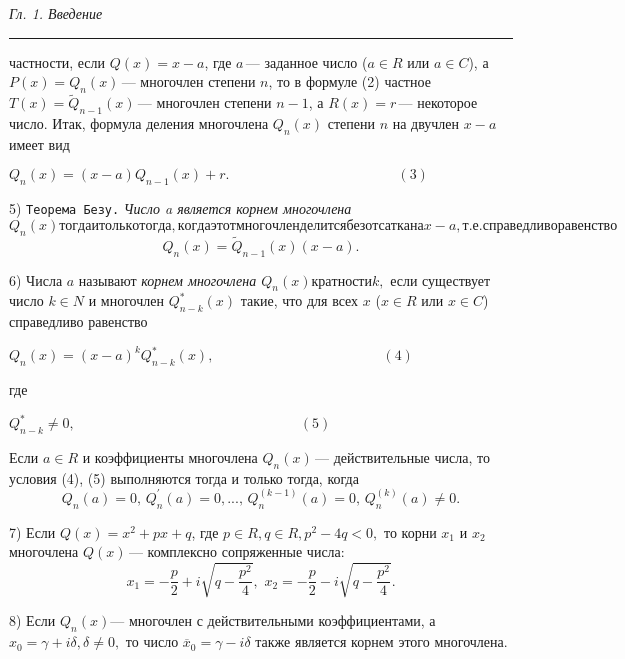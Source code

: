 \documentclass[a5paper, 16pt]{book}
\begin{document}
    \newpage

    \setcounter{page}{48}
    \begin{center}
        \begin{spacing}
            \small{\textit{Гл. 1. Введение}}
            \noindent\rule{\textwidth}{1pt}
		\end{spacing}
    \end{center}
     частности, если $Q(x) = x - a$, где $a \, \textbf{---}$ заданное число ($a \in R$ или $a \in C$), а $P(x) = Q_n (x) \, \textbf{---}$ многочлен степени $n$, то в формуле (2) частное $T(x) = \widetilde Q _ {n - 1} (x) \, \textbf{---}$ многочлен степени $n - 1$, а $R(x) = r \, \textbf{---}$ некоторое число. Итак, формула деления многочлена $Q_n (x)$ степени $n$ на двучлен $x - a$ имеет вид
    \begin{flushright}
    $Q_n (x) = (x - a)Q_{n - 1} (x) + r. \qquad \qquad \qquad \qquad \qquad \qquad (3)$
    \end{flushright}
    \par5) \texttt{Теорема Безу.} \textit{Число a является корнем многочлена $Q_n (x) тогда и только тогда, когда этот многочлен делится без отсатка на x - a, т.е. справедливо равенство$}
    $$Q_n (x) = \widetilde Q _{n - 1} (x)(x - a).$$
    \par6) Числа $a$ называют \textit{корнем многочлена $Q_n (x) кратности k,$} если существует число $k \in N$ и многочлен $Q _{n - k} ^ * (x)$ такие, что для всех $x$ ($x \in R$ или $x \in C$) справедливо равенство  
    \begin{flushright}
    $Q_n (x) = (x- a)^k Q_{n - k} ^ * (x), \qquad \qquad \qquad \qquad \qquad \qquad (4)$
    \end{flushright}
    где
    \begin{flushright}
    $Q_{n - k} ^ *  \neq 0, \qquad \qquad \qquad \qquad \qquad \qquad \qquad \qquad (5)$
    \end{flushright}
    Если $a \in R$ и коэффициенты многочлена $Q_n (x) \, \textbf{---}$ действительные числа, то условия (4), (5) выполняются тогда и только тогда, когда
    $$Q_n (a) = 0, \, Q_n ^ {'} (a) = 0, ..., \, Q_n ^ (k - 1) (a) = 0, \, Q_n ^ {(k)} (a) \neq 0.$$
    \par7) Если $Q(x) = x^2 +px +q$, где $p \in R, q \in R, p^2 - 4q < 0,$ то корни $x_1$ и $x_2$ многочлена $Q(x) \, \textbf{---}$ комплексно сопряженные числа:
    $$x_1 = -\frac{p}{2} + i\sqrt{q - \frac{p^2}{4}} , \, \, x_2 = -\frac{p}{2} - i\sqrt{q - \frac{p^2}{4}} .$$
    \par8) Если $Q_n (x) \textbf{---}$ многочлен с действительными коэффициентами, а $x_0 = \gamma + i\delta, \delta \neq 0,$ то число $\overline{x} _0 = \gamma - i\delta$ также является корнем этого многочлена.
\end{document}
